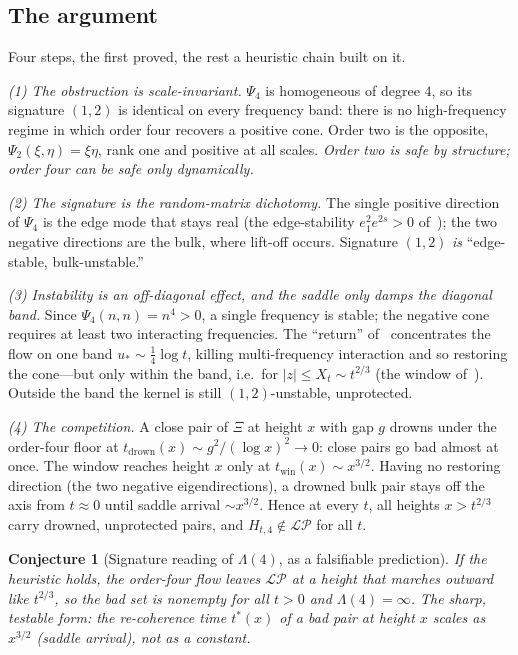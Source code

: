 \documentclass[11pt,reqno]{amsart}
\theoremstyle{plain}
\newtheorem{conjecture}[theorem]{Conjecture}
\theoremstyle{definition}
\theoremstyle{remark}
\newcommand{\LP}{\mathcal{LP}}
\begin{document}
\subsection{The argument}
Four steps, the first proved, the rest a heuristic chain built on it.

\emph{(1) The obstruction is scale-invariant.} $\Psi_4$ is homogeneous
of degree $4$, so its signature $(1,2)$ is identical on every frequency
band: there is no high-frequency regime in which order four recovers a
positive cone. Order two is the opposite, $\Psi_2(\xi,\eta)=\xi\eta$,
rank one and positive at all scales. \emph{Order two is safe by
structure; order four can be safe only dynamically.}

\emph{(2) The signature is the random-matrix dichotomy.} The single
positive direction of $\Psi_4$ is the edge mode that stays real
(the edge-stability $e_1^2e^{2s}>0$ of~\cite{FontesRMT}); the two
negative directions are the bulk, where lift-off occurs. Signature
$(1,2)$ \emph{is} ``edge-stable, bulk-unstable.''

\emph{(3) Instability is an off-diagonal effect, and the saddle only
damps the diagonal band.} Since $\Psi_4(n,n)=n^4>0$, a single frequency
is stable; the negative cone requires at least two interacting
frequencies. The ``return'' of~\cite{FontesIBM} concentrates the flow on
one band $u_*\sim\tfrac14\log t$, killing multi-frequency interaction
and so restoring the cone---but only within the band, i.e.\ for
$|z|\le X_t\sim t^{2/3}$ (the window of~\cite{FontesIBM}). Outside the
band the kernel is still $(1,2)$-unstable, unprotected.

\emph{(4) The competition.} A close pair of $\Xi$ at height $x$ with gap
$g$ drowns under the order-four floor at
$t_{\mathrm{drown}}(x)\sim g^2/(\log x)^2\to0$: close pairs go bad
almost at once. The window reaches height $x$ only at
$t_{\mathrm{win}}(x)\sim x^{3/2}$. Having no restoring direction
(the two negative eigendirections), a drowned bulk pair stays off the
axis from $t\approx0$ until saddle arrival $\sim x^{3/2}$. Hence at every
$t$, all heights $x>t^{2/3}$ carry drowned, unprotected pairs, and
$H_{t,4}\notin\LP$ for all $t$.

\begin{conjecture}[Signature reading of $\Lambda(4)$, as a falsifiable
prediction]\label{conj:lambda4}
If the heuristic holds, the order-four flow leaves $\LP$ at a height that
marches outward like $t^{2/3}$, so the bad set is nonempty for all $t>0$
and $\Lambda(4)=\infty$. The sharp, testable form: the re-coherence time
$t^\ast(x)$ of a bad pair at height $x$ scales as $x^{3/2}$ (saddle
arrival), not as a constant.
\end{conjecture}
\end{document}

